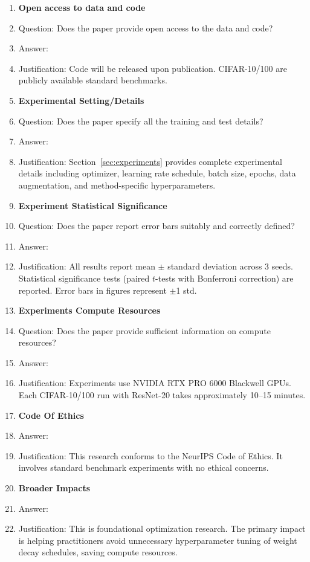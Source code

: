 \documentclass{article}
\begin{document}
\begin{enumerate}
\item {\bf Open access to data and code}
    \item[] Question: Does the paper provide open access to the data and code?
    \item[] Answer: \answerNo{}
    \item[] Justification: Code will be released upon publication. CIFAR-10/100 are publicly available standard benchmarks.

\item {\bf Experimental Setting/Details}
    \item[] Question: Does the paper specify all the training and test details?
    \item[] Answer: \answerYes{}
    \item[] Justification: Section~\ref{sec:experiments} provides complete experimental details including optimizer, learning rate schedule, batch size, epochs, data augmentation, and method-specific hyperparameters.

\item {\bf Experiment Statistical Significance}
    \item[] Question: Does the paper report error bars suitably and correctly defined?
    \item[] Answer: \answerYes{}
    \item[] Justification: All results report mean $\pm$ standard deviation across 3 seeds. Statistical significance tests (paired $t$-tests with Bonferroni correction) are reported. Error bars in figures represent $\pm$1 std.

\item {\bf Experiments Compute Resources}
    \item[] Question: Does the paper provide sufficient information on compute resources?
    \item[] Answer: \answerYes{}
    \item[] Justification: Experiments use NVIDIA RTX PRO 6000 Blackwell GPUs. Each CIFAR-10/100 run with ResNet-20 takes approximately 10--15 minutes.

\item {\bf Code Of Ethics}
    \item[] Answer: \answerYes{}
    \item[] Justification: This research conforms to the NeurIPS Code of Ethics. It involves standard benchmark experiments with no ethical concerns.

\item {\bf Broader Impacts}
    \item[] Answer: \answerNA{}
    \item[] Justification: This is foundational optimization research. The primary impact is helping practitioners avoid unnecessary hyperparameter tuning of weight decay schedules, saving compute resources.


\end{enumerate}
\end{document}
